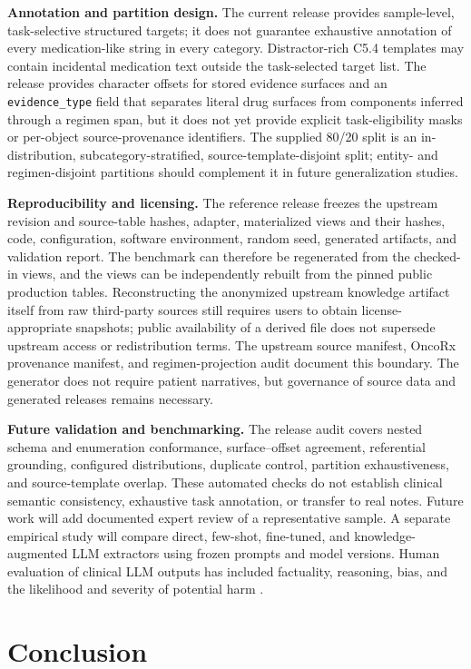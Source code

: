 \documentclass[conference]{IEEEtran}
\newcommand{\code}[1]{\texttt{#1}}
\newcommand{\kbname}{the anonymized upstream knowledge artifact}
\newcommand{\kbname}{UOTD}
\begin{document}
\textbf{Annotation and partition design.}
The current release provides sample-level, task-selective structured targets;
it does not guarantee exhaustive annotation of every medication-like string in
every category. Distractor-rich C5.4 templates may contain incidental medication
text outside the task-selected target list. The release provides character
offsets for stored evidence surfaces and an \code{evidence\_type} field that
separates literal drug surfaces from components inferred through a regimen
span, but it does not yet provide explicit task-eligibility masks or per-object
source-provenance identifiers. The supplied 80/20 split is an in-distribution,
subcategory-stratified, source-template-disjoint split; entity- and
regimen-disjoint partitions should complement it in future generalization
studies.

\textbf{Reproducibility and licensing.}
The reference release freezes the upstream revision and source-table hashes,
adapter, materialized views and their hashes, code, configuration, software
environment, random seed, generated artifacts, and validation report. The
benchmark can therefore be regenerated from the checked-in views, and the views
can be independently rebuilt from the pinned public production tables.
Reconstructing \kbname{} itself from raw third-party sources still requires users to
obtain license-appropriate snapshots; public availability of a derived file
does not supersede upstream access or redistribution terms. The upstream source
manifest, OncoRx provenance manifest, and regimen-projection audit document this
boundary. The generator does not require patient narratives, but governance of
source data and generated releases remains necessary.

\textbf{Future validation and benchmarking.}
The release audit covers nested schema and enumeration conformance,
surface--offset agreement, referential grounding, configured distributions,
duplicate control, partition exhaustiveness, and source-template overlap.
These automated checks do not establish clinical semantic consistency,
exhaustive task annotation, or transfer to real notes. Future work will add
documented expert review of a representative sample. A separate empirical study
will compare direct, few-shot, fine-tuned, and knowledge-augmented LLM
extractors using frozen prompts and model versions. Human evaluation of clinical
LLM outputs has included factuality, reasoning, bias, and the likelihood and
severity of potential harm \cite{singhal2023}.

\section{Conclusion}
\label{sec:conclusion}
\end{document}
